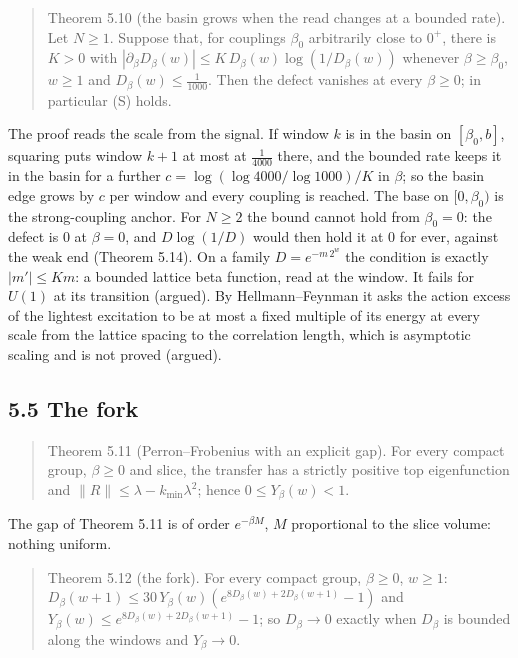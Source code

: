 \documentclass[10pt,letterpaper,twocolumn]{article}
\begin{document}
\begin{quote}
Theorem 5.10 (the basin grows when the read changes at a bounded rate). Let \(N\ge1\). Suppose that, for couplings \(\beta_0\) arbitrarily close to \(0^+\), there is \(K>0\) with \(|\partial_\beta D_\beta(w)|\le K\,D_\beta(w)\log(1/D_\beta(w))\) whenever \(\beta\ge\beta_0\), \(w\ge1\) and \(D_\beta(w)\le\tfrac1{1000}\). Then the defect vanishes at every \(\beta\ge0\); in particular (S) holds.
\end{quote}

The proof reads the scale from the signal. If window \(k\) is in the basin on \([\beta_0,b]\), squaring puts window \(k+1\) at most at \(\tfrac1{4000}\) there, and the bounded rate keeps it in the basin for a further \(c=\log(\log4000/\log1000)/K\) in \(\beta\); so the basin edge grows by \(c\) per window and every coupling is reached. The base on \([0,\beta_0)\) is the strong-coupling anchor. For \(N\ge2\) the bound cannot hold from \(\beta_0=0\): the defect is \(0\) at \(\beta=0\), and \(D\log(1/D)\) would then hold it at \(0\) for ever, against the weak end (Theorem 5.14). On a family \(D=e^{-m\,2^w}\) the condition is exactly \(|m'|\le K m\): a bounded lattice beta function, read at the window. It fails for \(U(1)\) at its transition (argued). By Hellmann--Feynman it asks the action excess of the lightest excitation to be at most a fixed multiple of its energy at every scale from the lattice spacing to the correlation length, which is asymptotic scaling and is not proved (argued).

\subsection{5.5 The fork}\label{55-the-fork}

\begin{quote}
Theorem 5.11 (Perron--Frobenius with an explicit gap). For every compact group, \(\beta\ge0\) and slice, the transfer has a strictly positive top eigenfunction and \(\|R\|\le\lambda-k_{\min}\lambda^2\); hence \(0\le Y_\beta(w)<1\).
\end{quote}

The gap of Theorem 5.11 is of order \(e^{-\beta M}\), \(M\) proportional to the slice volume: nothing uniform.

\begin{quote}
Theorem 5.12 (the fork). For every compact group, \(\beta\ge0\), \(w\ge1\): \(D_\beta(w+1)\le30\,Y_\beta(w)(e^{8D_\beta(w)+2D_\beta(w+1)}-1)\) and \(Y_\beta(w)\le e^{8D_\beta(w)+2D_\beta(w+1)}-1\); so \(D_\beta\to0\) exactly when \(D_\beta\) is bounded along the windows and \(Y_\beta\to0\).
\end{quote}
\end{document}
